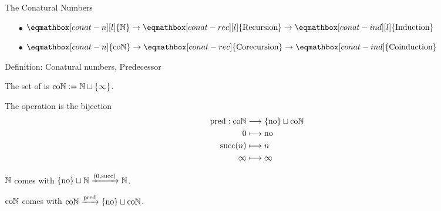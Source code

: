 
\begin{frame}{The Conatural Numbers} %

  \begin{itemize}[nosep]
    \item[$\bullet$] $\eqmathbox[conat-n][l]{\N} \to \eqmathbox[conat-rec][l]{\text{Recursion}} \to \eqmathbox[conat-ind][l]{\text{Induction}}$
    \item[$\bullet$] $\eqmathbox[conat-n]{\coN} \to \eqmathbox[conat-rec]{\text{Corecursion}} \to \eqmathbox[conat-ind]{\text{Coinduction}}$
  \end{itemize}

  \pause

  \begin{block}{Definition: Conatural numbers, Predecessor}

    \par The set of  is $\mathrm{co}\mathbb{N} := \mathbb{N} \sqcup \{\infty\}$.
    \pause
    \par The  operation is the bijection
    \begin{align*}
      \operatorname{pred} : \mathrm{co}\mathbb{N}
      &\longrightarrow \{\mathrm{no}\} \sqcup \mathrm{co}\mathbb{N}
      \\
      0
      &\longmapsto \mathrm{no}
      \\
      \operatorname{succ}(n)
      &\longmapsto n
      \\
      \infty
      &\longmapsto \infty
    \end{align*}
  \end{block}

  \pause

  \par $\mathbb{N}$ comes with $\{\mathrm{no}\} \sqcup \mathbb{N} \xrightarrow{(0, \operatorname{succ})} \mathbb{N}$.
  \par $\mathrm{co}\mathbb{N}$ comes with $\mathrm{co}\mathbb{N} \xrightarrow{\operatorname{pred}} \{\mathrm{no}\} \sqcup \mathrm{co}\mathbb{N}$.

\end{frame}

